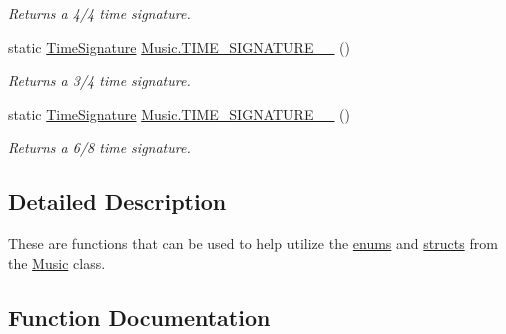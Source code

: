 \begin{DoxyCompactItemize}
\begin{DoxyCompactList}\small\item\em Returns a 4/4 time signature. \end{DoxyCompactList}\item 
static \hyperlink{group___music_structs_struct_music_1_1_time_signature}{Time\+Signature} \hyperlink{group___music_stat_func_ga0392e239cbd45a23e5f76f88d0b4c152}{Music.\+T\+I\+M\+E\+\_\+\+S\+I\+G\+N\+A\+T\+U\+R\+E\+\_\+\_} ()
\begin{DoxyCompactList}\small\item\em Returns a 3/4 time signature. \end{DoxyCompactList}\item 
static \hyperlink{group___music_structs_struct_music_1_1_time_signature}{Time\+Signature} \hyperlink{group___music_stat_func_gabfda54cf40e32a4299de5a2fde753347}{Music.\+T\+I\+M\+E\+\_\+\+S\+I\+G\+N\+A\+T\+U\+R\+E\+\_\+\_} ()
\begin{DoxyCompactList}\small\item\em Returns a 6/8 time signature. \end{DoxyCompactList}\end{DoxyCompactItemize}


\subsection{Detailed Description}
These are functions that can be used to help utilize the \hyperlink{group___music_enums}{enums} and \hyperlink{group___music_structs}{structs} from the \hyperlink{class_music}{Music} class. 

\subsection{Function Documentation}
\mbox{\label{group___music_stat_func_gaaf74885e43eb623f64f961985fadcd08}} 
